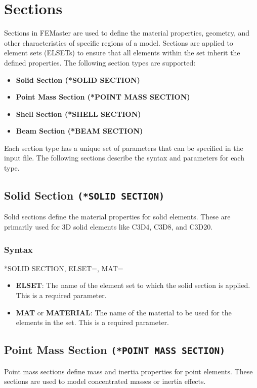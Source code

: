 
\chapter{Sections}
\label{chap:sections}

Sections in FEMaster are used to define the material properties, geometry, and other characteristics of specific regions of a model. Sections are applied to element sets (ELSETs) to ensure that all elements within the set inherit the defined properties. The following section types are supported:

\begin{itemize}
\item \textbf{Solid Section (*SOLID SECTION)}
\item \textbf{Point Mass Section (*POINT MASS SECTION)}
\item \textbf{Shell Section (*SHELL SECTION)}
\item \textbf{Beam Section (*BEAM SECTION)}
\end{itemize}

Each section type has a unique set of parameters that can be specified in the input file. The following sections describe the syntax and parameters for each type.

\section{Solid Section \texttt{(*SOLID SECTION)}}
Solid sections define the material properties for solid elements. These are primarily used for 3D solid elements like C3D4, C3D8, and C3D20.

\subsection{Syntax}
\begin{codeBlock}
*SOLID SECTION, ELSET=, MAT=
\end{codeBlock}

\begin{itemize}
\item \textbf{ELSET}: The name of the element set to which the solid section is applied. This is a required parameter.
\item \textbf{MAT} or \textbf{MATERIAL}: The name of the material to be used for the elements in the set. This is a required parameter.
\end{itemize}

\section{Point Mass Section \texttt{(*POINT MASS SECTION)}}
Point mass sections define mass and inertia properties for point elements. These sections are used to model concentrated masses or inertia effects.

